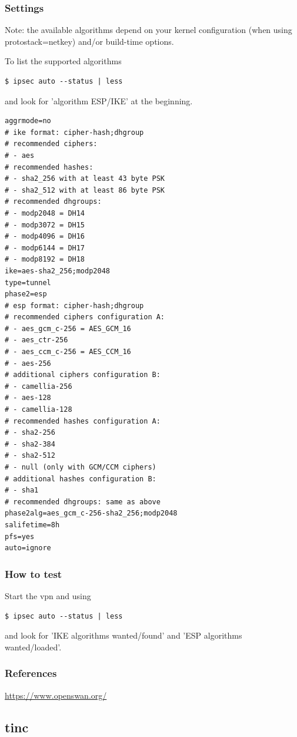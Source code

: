 \subsubsection{Settings}
Note: the available algorithms depend on your kernel configuration (when using protostack=netkey) and/or build-time options.

To list the supported algorithms
\begin{lstlisting}
$ ipsec auto --status | less
\end{lstlisting}
and look for 'algorithm ESP/IKE' at the beginning.

\begin{lstlisting}
aggrmode=no
# ike format: cipher-hash;dhgroup
# recommended ciphers:
# - aes
# recommended hashes:
# - sha2_256 with at least 43 byte PSK
# - sha2_512 with at least 86 byte PSK
# recommended dhgroups:
# - modp2048 = DH14
# - modp3072 = DH15
# - modp4096 = DH16
# - modp6144 = DH17
# - modp8192 = DH18
ike=aes-sha2_256;modp2048
type=tunnel
phase2=esp
# esp format: cipher-hash;dhgroup
# recommended ciphers configuration A:
# - aes_gcm_c-256 = AES_GCM_16
# - aes_ctr-256
# - aes_ccm_c-256 = AES_CCM_16
# - aes-256
# additional ciphers configuration B:
# - camellia-256
# - aes-128
# - camellia-128
# recommended hashes configuration A:
# - sha2-256
# - sha2-384
# - sha2-512
# - null (only with GCM/CCM ciphers)
# additional hashes configuration B:
# - sha1
# recommended dhgroups: same as above
phase2alg=aes_gcm_c-256-sha2_256;modp2048
salifetime=8h
pfs=yes
auto=ignore
\end{lstlisting}

\subsubsection{How to test}
Start the vpn and using
\begin{lstlisting}
$ ipsec auto --status | less
\end{lstlisting}
and look for 'IKE algorithms wanted/found' and 'ESP algorithms wanted/loaded'.

\subsubsection{References}
\begin{itemize*}
  \item \url{https://www.openswan.org/}
\end{itemize*}


\subsection{tinc}
